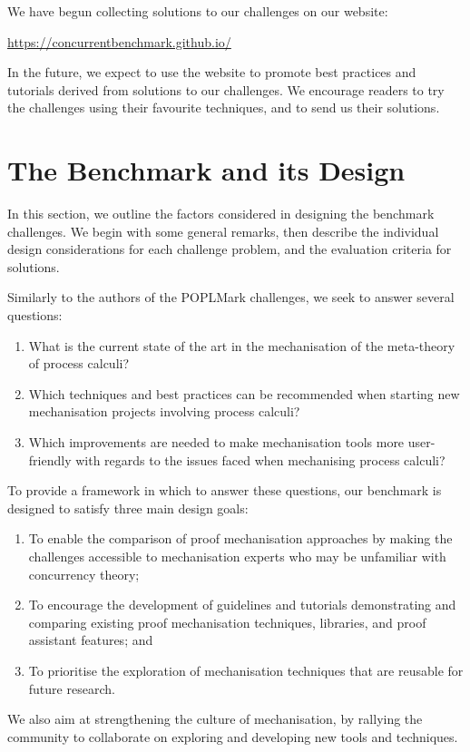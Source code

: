 \documentclass[runningheads]{llncs}
\begin{document}
We have begun collecting solutions to our challenges on our website:
%
\begin{center}
  \url{https://concurrentbenchmark.github.io/}
\end{center}
%
In the future, we expect to use the website to promote best practices and tutorials derived from solutions to our challenges.
We encourage readers to try the challenges using their favourite techniques, and to send us their solutions.

\section{The Benchmark and its Design}\label{sec:design-discussion}
In this section, we outline the factors considered in designing the benchmark challenges.
We begin with some general remarks, then describe the individual design considerations for each challenge problem, and the evaluation criteria for solutions.

Similarly to the authors of the POPLMark challenges, we seek to answer several questions:
\begin{enumerate}[label=\textbf{(Q\arabic*)},leftmargin=10mm]
\item\label{item:rq1} What is the current state of the art in the mechanisation of  the meta-theory of process calculi?
\item\label{item:rq2} Which techniques and best practices can be recommended when starting new mechanisation projects involving process calculi?
\item\label{item:rq3} Which improvements are needed to make mechanisation tools more user-friendly with regards to the issues faced when mechanising process calculi?
\end{enumerate}

To provide a framework in which to answer these questions, our benchmark is designed to satisfy three main design goals:
\begin{enumerate}[label=\textbf{(G\arabic*)},leftmargin=10mm]
\item\label{item:goal-comperison-accessibility} To enable the comparison of
  proof mechanisation approaches by making the challenges accessible to
  mechanisation experts who may be unfamiliar with concurrency theory;

\item\label{item:goal-tutorials} To encourage the development of guidelines and
  tutorials demonstrating and comparing existing proof mechanisation
  techniques, libraries, and proof assistant features; and

\item\label{item:goal-reusability} To prioritise the exploration of mechanisation
  techniques that are reusable for future research.
\end{enumerate}
We also aim at strengthening the culture of mechanisation, by rallying the community to collaborate on exploring and developing new tools and techniques.
\end{document}

